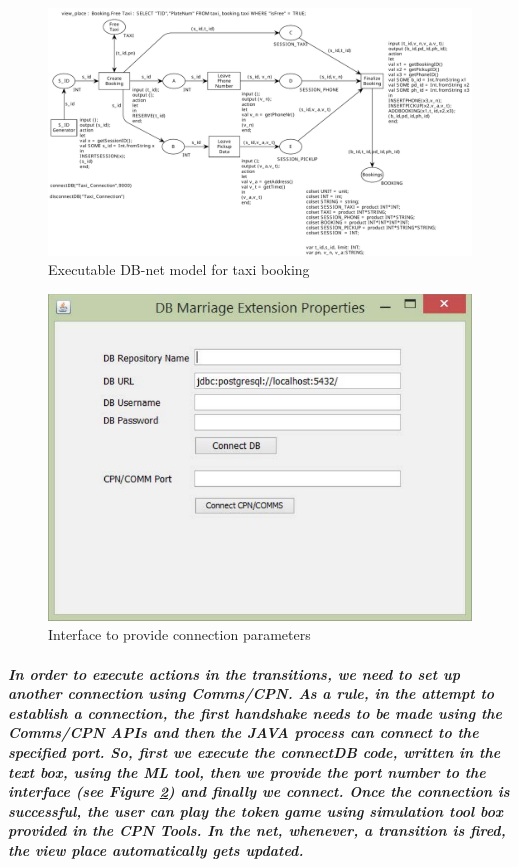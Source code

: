 \begin{figure}[!htbp]
	\centering
	\includegraphics[scale = 0.35]{DBN_Impl_executable_model.pdf}
	\caption{Executable DB-net model for taxi booking}
	\label{fig:DBN_Impl_executable_model}
\end{figure}

\begin{figure}[!htbp]
	\centering
	\includegraphics[scale = 0.75]{DBN_Impl_Extension_Dialog.pdf}
	\caption{Interface to provide connection parameters}
	\label{fig:DBN_Impl_Extension_Dialog}
\end{figure}

\subparagraph*{\textnormal{In order to execute actions in the transitions, we need to set up another connection using Comms/CPN. As a rule, in the attempt to establish a connection, the first handshake needs to be made using the Comms/CPN APIs and then the JAVA process can connect to the specified port. So, first we execute the \textit{connectDB} code, written in the text box, using the ML tool, then we provide the port number to the interface (see Figure \ref{fig:DBN_Impl_Extension_Dialog}) and finally we connect. Once the connection is successful, the user can play the token game using simulation tool box provided in the CPN Tools. In the net, whenever, a transition is fired, the view place automatically gets updated.}}

